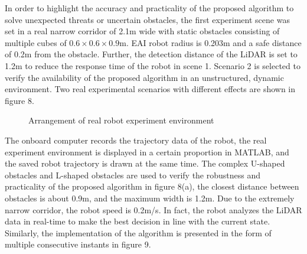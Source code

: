 \documentclass{iosart2c}
\begin{document}
In order to highlight the accuracy and practicality of the proposed algorithm to solve unexpected threats or uncertain obstacles, the first experiment scene was set in a real narrow corridor of 2.1m wide with static obstacles consisting of multiple cubes of $0.6 \times 0.6 \times 0.9 \mathrm{m}$. EAI robot radius is 0.203m and a safe distance of 0.2m from the obstacle. Further, the detection distance of the LiDAR is set to 1.2m to reduce the response time of the robot in scene 1. Scenario 2 is selected to verify the availability of the proposed algorithm in an unstructured, dynamic environment. Two real experimental scenarios with different effects are shown in figure 8. 
\begin{figure}[htbp] %
\vspace{-0.2cm} 
\setlength{\abovecaptionskip}{0.1cm}  %
\centering
{}\hspace{-1mm}
\caption{  Arrangement of real robot experiment environment }
\end{figure}
The onboard computer records the trajectory data of the robot, the real experiment environment is displayed in a certain proportion in MATLAB, and the saved robot trajectory is drawn at the same time. The complex U-shaped obstacles and L-shaped obstacles are used to verify the robustness and practicality of the proposed algorithm in figure 8(a), the closest distance between obstacles is about 0.9m, and the maximum width is 1.2m. Due to the extremely narrow corridor, the robot speed is 0.2m/s. In fact, the robot analyzes the LiDAR data in real-time to make the best decision in line with the current state. Similarly, the implementation of the algorithm is presented in the form of multiple consecutive instants in figure 9.
\end{document}
